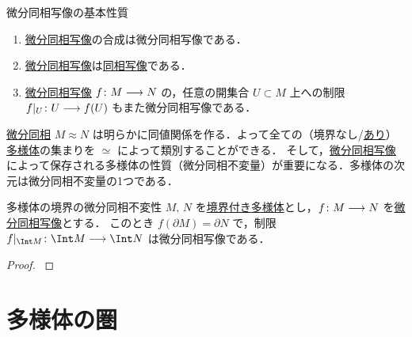 \documentclass[geometry_main]{subfiles}
\begin{document}
\begin{myprop}[label=prop:diff-basic]{微分同相写像の基本性質}
	\begin{enumerate}
		\item \hyperref[def.diff]{微分同相写像}の合成は微分同相写像である．
		\item \hyperref[def.diff]{微分同相写像}は\hyperref[def.homeo]{同相写像}である．
		\item \hyperref[def.diff]{微分同相写像} $f \colon M \longrightarrow N$ の，任意の開集合 $U \subset M$ 上への制限 $f|_U \colon U \longrightarrow f(U)$ もまた微分同相写像である．
	\end{enumerate}
\end{myprop}


\hyperref[def.diff]{微分同相} $M \approx N$ は明らかに同値関係を作る．よって全ての（境界なし/\hyperref[def:mani-with-boundary]{あり}） \hyperref[diffmani]{\cinfty 多様体}の集まりを $\simeq$ によって類別することができる．
そして，\hyperref[def.diff]{微分同相写像}によって保存される\cinfty 多様体の性質（微分同相不変量）が重要になる．多様体の次元は微分同相不変量の1つである．

\begin{myprop}[]{多様体の境界の微分同相不変性}
	$M,\, N$ を\hyperref[def:mani-with-boundary]{境界付き}\hyperref[diffmani]{\cinfty 多様体}とし，$f \colon M \longrightarrow N$ を\hyperref[def.diff]{微分同相写像}とする．
	このとき $f(\partial M) = \partial N$ で，制限 $f|_{\Int M} \colon \Int M \lto \Int N$ は微分同相写像である．
\end{myprop}

\begin{proof}
	\cite[Theorem 1.46]{Lee12}
\end{proof}

\section{多様体の圏}
\end{document}
